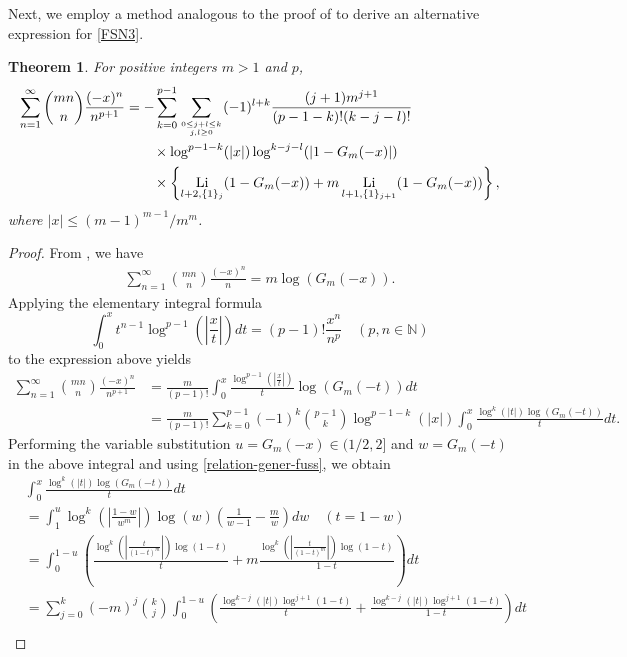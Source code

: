 \documentclass[11pt]{article}
\DeclareMathOperator{\Li}{Li}
\def\N{\mathbb{N}}
\theoremstyle{plain}
\newtheorem{thm}{Theorem}[section]
\theoremstyle{definition}
\begin{document}
Next, we employ a method analogous to the proof of \cite[Theorem 3.8]{WLX2022} to derive an alternative expression for \eqref{FSN3}.
\begin{thm}\label{thm-AFSN3} For positive integers $m>1$ and $p$,
\begin{align}\label{AFSN3}
\sum_{n=1}^\infty \binom{mn}{n}\frac{(-x)^n}{n^{p+1}}&=-\sum_{k=0}^{p-1} \sum_{0\leq j+l\leq k\atop j,l\geq 0}  (-1)^{l+k} \frac{(j+1)m^{j+1}}{(p-1-k)!(k-j-l)!}\nonumber\\&\quad\quad\times \log^{p-1-k}(|x|)\log^{k-j-l}(|1-G_m(-x)|)\nonumber\\&\quad\quad\times \left\{\Li_{l+2,\{1\}_{j}}(1-G_m(-x))+m \Li_{l+1,\{1\}_{j+1}} (1-G_m(-x)) \right\},
\end{align}
where $|x|\leq(m-1)^{m-1}/m^m$.
\end{thm}
\begin{proof}
From \cite[Eq. (3.11)]{WLX2022}, we have
\begin{align*}
\sum_{n=1}^\infty \binom{mn}{n}\frac{(-x)^n}{n}=m\log(G_m(-x)).
\end{align*}
Applying the elementary integral formula
\[\int_0^x t^{n-1}\log^{p-1}\left(\left\vert\frac{x}{t}\right\vert\right)dt=(p-1)!\frac{x^n}{n^{p}}\quad (p,n\in\N)\]
to the expression above yields
\begin{align}\label{proof-Apery-one}
\sum_{n=1}^\infty \binom{mn}{n}\frac{(-x)^n}{n^{p+1}}&=\frac{m}{(p-1)!}\int_0^x \frac{\log^{p-1}\left(\left\vert\frac{x}{t}\right\vert\right)}{t}\log(G_m(-t))dt\nonumber\\
&=\frac{m}{(p-1)!} \sum_{k=0}^{p-1} (-1)^k \binom{p-1}{k} \log^{p-1-k}(|x|) \int_0^x \frac{\log^k(|t|)\log(G_m(-t))}{t}dt.
\end{align}
Performing the variable substitution $u=G_m(-x)\in (1/2,2]$ and $w=G_m(-t)$ in the above integral and using \eqref{relation-gener-fuss}, we obtain
\begin{align}\label{proof-Apery-two}
&\int_0^x \frac{\log^k(|t|)\log(G_m(-t))}{t}dt\nonumber\\
&=\int_1^u \log^k\left(\left\vert\frac{1-w}{w^m}\right\vert  \right)\log(w)\left(\frac1{w-1}-\frac{m}{w}\right)dw\quad (t=1-w)\nonumber\\
&=\int_0^{1-u} \left(\frac{\log^k\left(\left\vert \frac{t}{(1-t)^m} \right\vert\right)\log(1-t)}{t}+m \frac{\log^k\left(\left\vert \frac{t}{(1-t)^m} \right\vert\right)\log(1-t)}{1-t}\right)dt\nonumber\\
&=\sum_{j=0}^k (-m)^j\binom{k}{j}\int_0^{1-u} \left(\frac{\log^{k-j}(|t|)\log^{j+1}(1-t)}{t}+\frac{\log^{k-j}(|t|)\log^{j+1}(1-t)}{1-t} \right)dt\nonumber\\

\end{align}
\end{proof}
\end{document}
